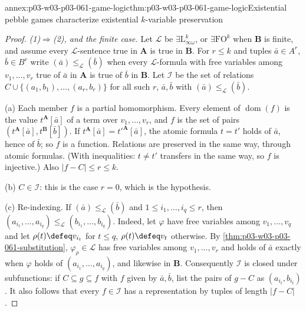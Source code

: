 \begin{annexitem}{annex:p03-w03-p03-061-game-logic}{thm:p03-w03-p03-061-game-logic}{Existential pebble games characterize existential \(k\)-variable preservation}
\begin{proof}
\emph{(1)\(\Rightarrow\)(2), and the finite case.} Let \(\mathcal L\) be
\(\exists\mathrm L^k_{\infty\omega}\), or \(\exists\mathrm{FO}^k\) when
\(\mathbf B\) is finite, and assume every \(\mathcal L\)-sentence true in
\(\mathbf A\) is true in \(\mathbf B\). For \(r\le k\) and tuples
\(\bar a\in A^r\), \(\bar b\in B^r\) write
\((\bar a)\le_{\mathcal L}(\bar b)\) when every \(\mathcal L\)-formula with
free variables among \(v_1,\ldots,v_r\) true of \(\bar a\) in \(\mathbf A\) is
true of \(\bar b\) in \(\mathbf B\). Let \(\mathcal I\) be the set of
relations \(C\cup\{(a_1,b_1),\ldots,(a_r,b_r)\}\) for all such \(r\),
\(\bar a,\bar b\) with \((\bar a)\le_{\mathcal L}(\bar b)\).

(a) Each member \(f\) is a partial homomorphism. Every element of
\(\operatorname{dom}(f)\) is the value \(t^{\mathbf A}[\bar a]\) of a term
over \(v_1,\ldots,v_r\), and \(f\) is the set of pairs
\((t^{\mathbf A}[\bar a],t^{\mathbf B}[\bar b])\). If
\(t^{\mathbf A}[\bar a]=t'^{\mathbf A}[\bar a]\), the atomic formula
\(t=t'\) holds of \(\bar a\), hence of \(\bar b\); so \(f\) is a function.
Relations are preserved in the same way, through atomic formulas. (With
inequalities: \(t\neq t'\) transfers in the same way, so \(f\) is
injective.) Also \(|f-C|\le r\le k\).

(b) \(C\in\mathcal I\): this is the case \(r=0\), which is the hypothesis.

(c) Re-indexing. If \((\bar a)\le_{\mathcal L}(\bar b)\) and
\(1\le i_1,\ldots,i_q\le r\), then \((a_{i_1},\ldots,a_{i_q})
\le_{\mathcal L}(b_{i_1},\ldots,b_{i_q})\). Indeed, let \(\varphi\) have free
variables among \(v_1,\ldots,v_q\) and let \(\rho(t)\defeq v_{i_t}\) for
\(t\le q\), \(\rho(t)\defeq v_t\) otherwise. By
\cref{thm:p03-w03-p03-061-substitution}, \(\varphi_\rho\in\mathcal L\) has
free variables among \(v_1,\ldots,v_r\) and holds of \(\bar a\) exactly
when \(\varphi\) holds of \((a_{i_1},\ldots,a_{i_q})\), and likewise in
\(\mathbf B\). Consequently \(\mathcal I\) is closed under subfunctions: if
\(C\subseteq g\subseteq f\) with \(f\) given by \(\bar a,\bar b\), list the
pairs of \(g-C\) as \((a_{i_t},b_{i_t})\). It also follows that every
\(f\in\mathcal I\) has a representation by tuples of length
\(|f-C|\).


\end{proof}
\end{annexitem}
